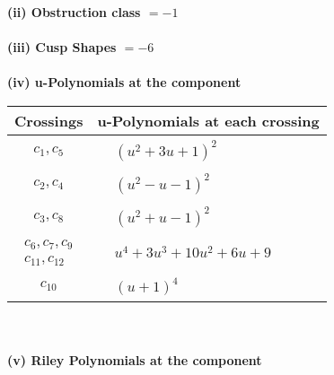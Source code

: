 \documentclass[1p]{elsarticle_modified}
\theoremstyle{definition}
\begin{document}
\flushleft \textbf{(ii) Obstruction class $= -1$}\\~\\
\flushleft \textbf{(iii) Cusp Shapes $= -6$}\\~\\
\newpage\renewcommand{\arraystretch}{1}
\flushleft \textbf{(iv) u-Polynomials at the component}\newline \\
\begin{tabular}{m{50pt}|m{274pt}}
Crossings & \hspace{64pt}u-Polynomials at each crossing \\
\hline $$\begin{aligned}c_{1},c_{5}\end{aligned}$$&$\begin{aligned}
&(u^2+3 u+1)^2
\end{aligned}$\\
\hline $$\begin{aligned}c_{2},c_{4}\end{aligned}$$&$\begin{aligned}
&(u^2- u-1)^2
\end{aligned}$\\
\hline $$\begin{aligned}c_{3},c_{8}\end{aligned}$$&$\begin{aligned}
&(u^2+u-1)^2
\end{aligned}$\\
\hline $$\begin{aligned}c_{6},c_{7},c_{9}\\c_{11},c_{12}\end{aligned}$$&$\begin{aligned}
&u^4+3 u^3+10 u^2+6 u+9
\end{aligned}$\\
\hline $$\begin{aligned}c_{10}\end{aligned}$$&$\begin{aligned}
&(u+1)^4
\end{aligned}$\\
\hline
\end{tabular}\\~\\
\newpage\renewcommand{\arraystretch}{1}
\flushleft \textbf{(v) Riley Polynomials at the component}\newline \\
\end{document}
